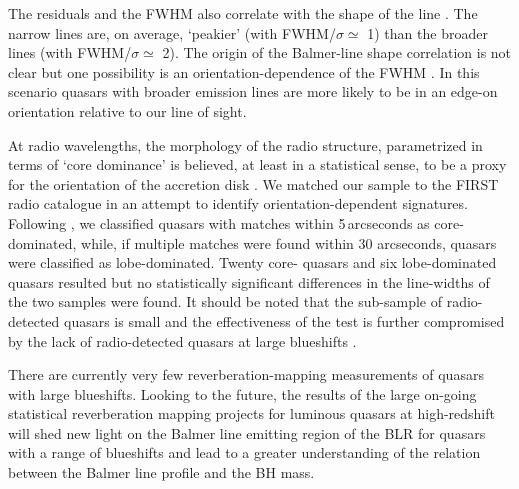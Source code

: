 The residuals and the \ha FWHM also correlate with the shape of the line \citep[FWHM/$\sigma$, where $\sigma$ is the dispersion, derived from the second moment velocity; e.g.][]{kollatschny11,Kollatschny13}. 
The narrow lines are, on average, `peakier' (with FWHM/$\sigma\simeq$ 1) than the broader lines (with FWHM/$\sigma\simeq$ 2).   
The origin of the Balmer-line shape correlation is not clear but one possibility is an orientation-dependence of the \ha FWHM \citep[e.g.][]{shen14}. 
In this scenario quasars with broader emission lines are more likely to be in an edge-on orientation relative to our line of sight.  
    
At radio wavelengths, the morphology of the radio structure, parametrized in terms of `core dominance' is believed, at least in a statistical sense, to be a proxy for the orientation of the accretion disk \citep[e.g.][]{jackson91}.
We matched our sample to the FIRST radio catalogue \citep{white97} in an attempt to identify orientation-dependent signatures.  
Following \citet{shen11}, we classified quasars with matches within 5\,arcseconds as core-dominated, while, if multiple matches were found within 30 arcseconds, quasars were classified as lobe-dominated. 
Twenty core- quasars and six lobe-dominated quasars resulted but no statistically significant differences in the \ha line-widths of the two samples were found. 
It should be noted that the sub-sample of radio-detected quasars is small and the effectiveness of the test is further compromised by the lack of radio-detected quasars at large blueshifts \citep[see figure 14 of][for example]{richards11}.

There are currently very few reverberation-mapping measurements of quasars with large  blueshifts.
Looking to the future, the results of the large on-going statistical reverberation mapping projects \citep[e.g.][]{shen15,kingoz15} for luminous quasars at high-redshift will shed new light on the Balmer line emitting region of the BLR for quasars with a range of  blueshifts and lead to a greater understanding of the relation between the Balmer line profile and the BH mass. 

